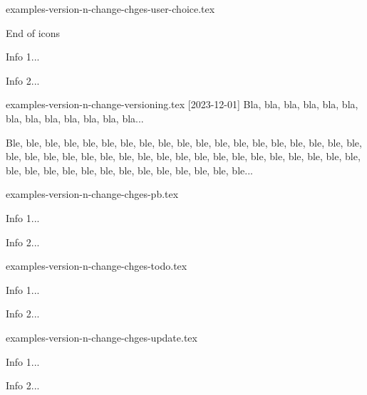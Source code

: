 \begin{filecontents*}[overwrite]{examples-version-n-change-chges-user-choice.tex}
\begin{tdoctopic}{End of icons}
    \item Info 1...
    \item Info 2...
\end{tdoctopic}
\end{filecontents*}


\begin{filecontents*}[overwrite]{examples-version-n-change-versioning.tex}
[2023-12-01]
Bla, bla, bla, bla, bla, bla, bla, bla, bla, bla, bla, bla, bla...

\bigskip %

Ble, ble, ble, ble, ble, ble, ble, ble, ble, ble, ble, ble, ble,
ble, ble, ble, ble, ble, ble, ble, ble, ble, ble, ble, ble, ble,
ble, ble, ble, ble, ble, ble, ble, ble, ble, ble, ble, ble, ble,
ble, ble, ble, ble, ble, ble, ble, ble, ble, ble, ble, ble...
\end{filecontents*}


\begin{filecontents*}[overwrite]{examples-version-n-change-chges-pb.tex}
\begin{tdocprob}
    \item Info 1...
    \item Info 2...
\end{tdocprob}
\end{filecontents*}


\begin{filecontents*}[overwrite]{examples-version-n-change-chges-todo.tex}
\begin{tdoctodo}
    \item Info 1...
    \item Info 2...
\end{tdoctodo}
\end{filecontents*}


\begin{filecontents*}[overwrite]{examples-version-n-change-chges-update.tex}
\begin{tdocupdate}
    \item Info 1...
    \item Info 2...
\end{tdocupdate}
\end{filecontents*}


